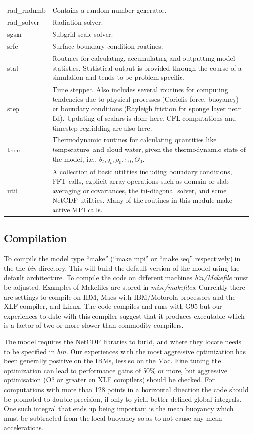 \documentclass[11pt,a4paper]{article}
\begin{document}
\begin{table}
\begin{center}
\begin{tabular}[htb]{p{0.15\linewidth}p{0.85\linewidth}}
\\ rad\_rndnmb & Contains a random number generator.
\\ rad\_solver & Radiation solver.
\\ sgsm &  Subgrid scale solver.
\\ srfc &  Surface boundary condition routines.
\\ stat &  Routines for calculating, accumulating and outputting model
statistics.  Statistical output is provided through the course of a
simulation and tends to be problem specific.
\\ step &  Time stepper.  Also includes several routines for computing
tendencies due to physical processes (Coriolis force, buoyancy) or
boundary conditions (Rayleigh friction for sponge layer near lid).
Updating of scalars is done here. CFL computations and
timestep-regridding are also here.
\\ thrm & Thermodynamic routines for calculating
quantities like temperature, and cloud water, given the thermodynamic
state of the model, i.e., $\theta_l,q_t,\rho_0,\pi_0,\Theta_0.$
\\ util & A collection of basic utilities including
boundary conditions, FFT calls, explicit array operations such as
domain or slab averaging or covariances, the tri-diagonal solver, and
some NetCDF utilities.  Many of the routines in this module make
active MPI calls.\\ \hline \hline
\end{tabular}
\end{center}
\end{table}

\subsection{Compilation}
To compile the model type ``make'' (``make mpi'' or ``make seq'' respectively) in the the 
\emph{bin} directory. This will build the default version of the model using the default
architecture. To compile the code on different machines \emph{bin/Makefile} 
must be adjusted. Examples of Makefiles are stored in \emph{misc/makefiles}.
Currently there are settings to compile on IBM, Macs with IBM/Motorola processors 
and the XLF compiler, and Linux. The code compiles and runs with G95 but our
experiences to date with this compiler suggest that it produces
executable which is a factor of two or more slower than commodity
compilers.

The model requires the NetCDF libraries to build, and where they
locate needs to be specified in \emph{bin.}  Our experiences with the
most aggressive optimization has been generally positive on the IBMs,
less so on the Mac.  Fine tuning the optimization can lead to
performance gains of 50\% or more, but aggressive optimisation (O3 or
greater on XLF compilers) should be checked.  For computations with
more than 128 points in a horizontal direction the code should be
promoted to double precision, if only to yield better defined global
integrals.  One such integral that ends up being important is the mean
buoyancy which must be subtracted from the local buoyancy so as to not
cause any mean accelerations.
\end{document}
